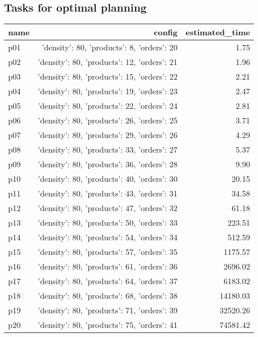 \documentclass{article}
\begin{document}
                                \subsection*{Tasks for optimal planning}
                                
                            \begin{center}
                            \scriptsize
                            \begin{tabular}{@{}l|r|r@{}}
                            name & config & estimated\_time\\\midrule
                              p01&{'density': 80, 'products': 8, 'orders': 20}&1.75\\
  p02&{'density': 80, 'products': 12, 'orders': 21}&1.96\\
  p03&{'density': 80, 'products': 15, 'orders': 22}&2.21\\
  p04&{'density': 80, 'products': 19, 'orders': 23}&2.47\\
  p05&{'density': 80, 'products': 22, 'orders': 24}&2.81\\
  p06&{'density': 80, 'products': 26, 'orders': 25}&3.71\\
  p07&{'density': 80, 'products': 29, 'orders': 26}&4.29\\
  p08&{'density': 80, 'products': 33, 'orders': 27}&5.37\\
  p09&{'density': 80, 'products': 36, 'orders': 28}&9.90\\
  p10&{'density': 80, 'products': 40, 'orders': 30}&20.15\\
  p11&{'density': 80, 'products': 43, 'orders': 31}&34.58\\
  p12&{'density': 80, 'products': 47, 'orders': 32}&61.18\\
  p13&{'density': 80, 'products': 50, 'orders': 33}&223.51\\
  p14&{'density': 80, 'products': 54, 'orders': 34}&512.59\\
  p15&{'density': 80, 'products': 57, 'orders': 35}&1175.57\\
  p16&{'density': 80, 'products': 61, 'orders': 36}&2696.02\\
  p17&{'density': 80, 'products': 64, 'orders': 37}&6183.02\\
  p18&{'density': 80, 'products': 68, 'orders': 38}&14180.03\\
  p19&{'density': 80, 'products': 71, 'orders': 39}&32520.26\\
  p20&{'density': 80, 'products': 75, 'orders': 41}&74581.42\\

\end{tabular}
\end{center}
\end{document}
